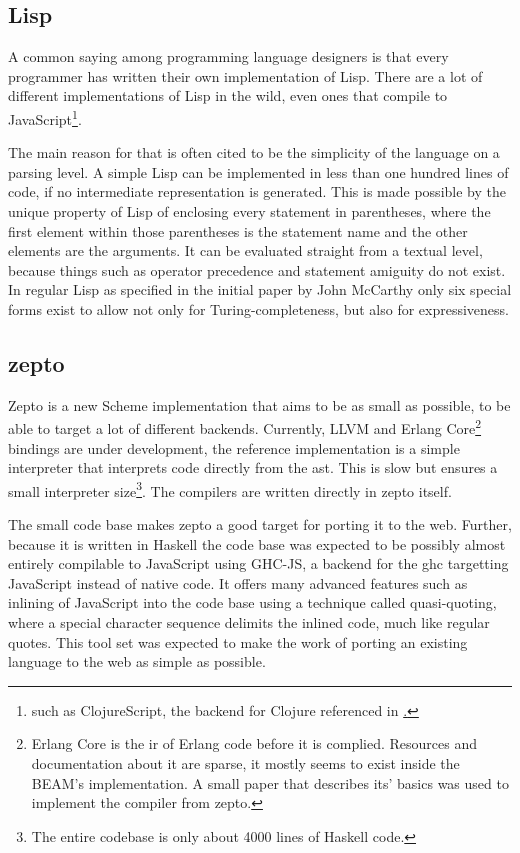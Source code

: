 \documentclass[oneside,11pt,xetex]{scrbook}
\begin{document}
\subsection{Lisp}

A common saying among programming language designers is that every programmer has written
their own implementation of Lisp. There are a lot of different implementations of Lisp
in the wild, even ones that compile to JavaScript\footnote{such as ClojureScript, the
backend for Clojure referenced in \href{sec:ClojureScript}.}.

The main reason for that is often cited to be the simplicity of the language on a parsing
level. A simple Lisp can be implemented in less than one hundred lines of code, if no
intermediate representation is generated. This is made possible by the unique property
of Lisp of enclosing every statement in parentheses, where the first element within
those parentheses is the statement name and the other elements are the arguments.
It can be evaluated straight from a textual level, because things such as operator precedence
and statement amiguity do not exist. In regular Lisp as specified in the initial paper by
John McCarthy\parencite{JCM} only six special forms exist to allow not only for Turing-completeness,
but also for expressiveness.

\subsection{zepto}

Zepto is a new Scheme implementation that aims to be as small as possible, to be able
to target a lot of different backends. Currently, LLVM and Erlang Core\footnote{Erlang Core 
is the \gls{ir} of Erlang code before it is complied. Resources and documentation
about it are sparse, it mostly seems to exist inside the BEAM's implementation. A small
paper\parencite{ERL} that describes its' basics was used to implement the compiler from
zepto.} bindings are under development, the reference implementation is a simple interpreter
that interprets code directly from the \gls{ast}. This is slow but ensures a small
interpreter size\footnote{The entire codebase is only about 4000 lines of Haskell code.}.
The compilers are written directly in zepto itself.

The small code base makes zepto a good target for porting it to the web. Further, because it
is written in Haskell the code base was expected to be possibly almost entirely compilable
to JavaScript using GHC-JS, a backend for the \gls{ghc} targetting JavaScript instead of
native code. It offers many advanced features such as inlining of JavaScript into the code
base using a technique called quasi-quoting, where a special character sequence delimits the
inlined code, much like regular quotes. This tool set was expected to make the work of porting
an existing language to the web as simple as possible.
\end{document}
